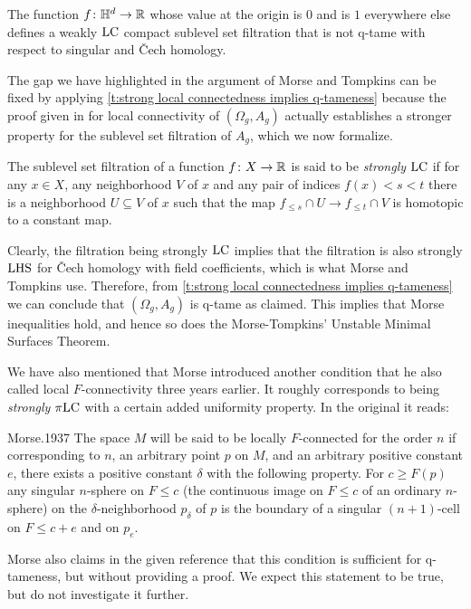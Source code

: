\begin{cor}\label{c: counterexample}
    The function $f \colon \mathbb{H}^d \to \mathbb{R}$ whose value at the origin is $0$ and is $1$ everywhere else defines a weakly $\mathrm{LC}$ compact sublevel set filtration that is not q-tame with respect to singular and \v{C}ech homology.
\end{cor}

The gap we have highlighted in the argument of Morse and Tompkins can be fixed by applying \cref{t:strong local connectedness implies q-tameness} because the proof given in \cite[p.464]{Morse.1939} for local connectivity of $(\Omega_g, A_g)$ actually establishes a stronger property for the sublevel set filtration of $A_g$, which we now formalize.

\begin{defi}
	The sublevel set filtration of a function $f \colon X \to \mathbb{R}$ is said to be \emph{strongly} $\mathrm{LC}$ if for any $x \in X$, any neighborhood $V$ of $x$ and any pair of indices $f(x) < s < t$ there is a neighborhood $U \subseteq V$ of $x$ such that the map $f_{\leq s} \cap U \to f_{\leq t} \cap V$ is homotopic to a constant map.
\end{defi}

Clearly, the filtration being strongly $\mathrm{LC}$ implies that the filtration is also strongly $\mathrm{LHS}$ for \v{C}ech homology with field coefficients, which is what Morse and Tompkins use.
Therefore, from \cref{t:strong local connectedness implies q-tameness} we can conclude that $(\Omega_g, A_g)$ is \mbox{q-tame} as claimed.
This implies that Morse inequalities hold, and hence so does the Morse-Tompkins' Unstable Minimal Surfaces Theorem.

We have also mentioned that Morse introduced another condition that he also called local $F$-connectivity three years earlier.
It roughly corresponds to being \emph{strongly} $\pi\mathrm{LC}$ with a certain added uniformity property.
In the original it reads:
\begin{displaycquote}[p.421-422]{Morse.1937}
	The space $M$ will be said to be locally $F$-connected for the order $n$ if corresponding to $n$, an arbitrary point $p$ on $M$, and an arbitrary positive constant $e$, there exists a positive constant $\delta$ with the following property.
    For $c \geq F(p)$ any singular $n$-sphere on $F \leq c$ (the continuous image on $F \leq c$ of an ordinary $n$-sphere) on the $\delta$-neighborhood $p_{\delta}$ of $p$ is the boundary of a singular $(n + 1)$-cell on $F \leq c + e$ and on $p_e$.
\end{displaycquote}
Morse also claims in the given reference that this condition is sufficient for q-tameness, but without providing a proof.
We expect this statement to be true, but do not investigate it further.